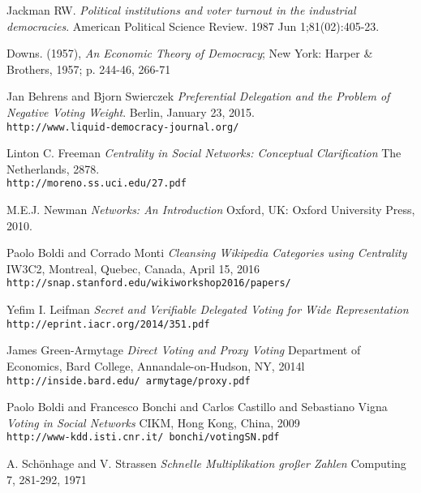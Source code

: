 \documentclass[10pt]{article}
\theoremstyle{definition}
\begin{document}
\begin{thebibliography}{9}

Jackman RW. \textit{Political institutions and voter turnout in the industrial democracies}. American Political Science Review. 1987 Jun 1;81(02):405-23.

Downs. (1957), \textit{An Economic Theory of Democracy}; New York: Harper \& Brothers, 1957; p. 244-46, 266-71

Jan Behrens and Bjorn Swierczek
\textit{Preferential Delegation and the Problem of Negative Voting Weight}. 
Berlin, January 23, 2015.
\\\texttt{http://www.liquid-democracy-journal.org/}


Linton C. Freeman
\textit{Centrality in Social Networks: Conceptual Clarification}
The Netherlands, 2878.
\\\texttt{http://moreno.ss.uci.edu/27.pdf}

M.E.J. Newman
\textit{Networks: An Introduction}
Oxford, UK: Oxford University Press, 2010.

Paolo Boldi and Corrado Monti
\textit{Cleansing Wikipedia Categories using Centrality}
IW3C2, Montreal, Quebec, Canada, April 15, 2016
\\\texttt{http://snap.stanford.edu/wikiworkshop2016/papers/}

Yefim I. Leifman
\textit{Secret and Verifiable Delegated Voting for Wide
Representation}
\\\texttt{http://eprint.iacr.org/2014/351.pdf}

James Green-Armytage
\textit{Direct Voting and Proxy Voting}
Department of Economics, Bard College, Annandale-on-Hudson, NY, 2014l
\\\texttt{http://inside.bard.edu/~armytage/proxy.pdf}

Paolo Boldi and Francesco Bonchi and Carlos Castillo and Sebastiano Vigna
\textit{Voting in Social Networks}
CIKM, Hong Kong, China, 2009
\\\texttt{http://www-kdd.isti.cnr.it/~bonchi/votingSN.pdf}

A. Schönhage and V. Strassen
\textit{Schnelle Multiplikation großer Zahlen}
Computing 7, 281-292, 1971

\end{thebibliography}
\end{document}
